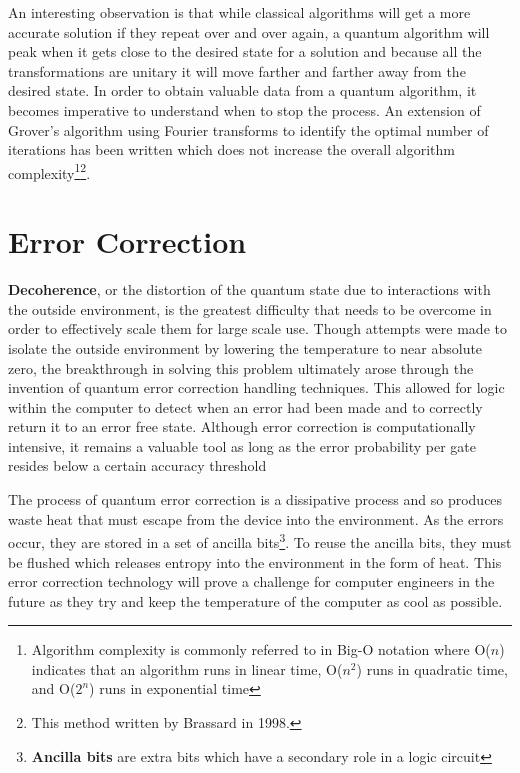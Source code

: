 \documentclass[12pt]{article}
\begin{document}
An interesting observation is that while classical algorithms will get a more accurate solution if they repeat over and over again, a quantum algorithm will peak when it gets close to the desired state for a solution and because all the transformations are unitary it will move farther and farther away from the desired state. In order to obtain valuable data from a quantum algorithm, it becomes imperative to understand when to stop the process. An extension of Grover's algorithm using Fourier transforms to identify the optimal number of iterations has been written which does not increase the overall algorithm complexity\footnote{Algorithm complexity is commonly referred to in Big-O notation where O($n$) indicates that an algorithm runs in linear time, O($n^2$) runs in quadratic time, and O($2^n$) runs in exponential time}\footnote{This method written by Brassard in 1998\cite{non}.}.
\section{Error Correction}
\textbf{Decoherence}, or the distortion of the quantum state due to interactions with the outside environment, is the greatest difficulty that needs to be overcome in order to effectively scale them for large scale use.\cite{non} Though attempts were made to isolate the outside environment by lowering the temperature to near absolute zero, the breakthrough in solving this problem ultimately arose through the invention of quantum error correction handling techniques. This allowed for logic within the computer to detect when an error had been made and to correctly return it to an error free state. Although error correction is computationally intensive, it remains a valuable tool as long as the error probability per gate resides below a certain accuracy threshold
\par
The process of quantum error correction is a dissipative process and so produces waste heat that must escape from the device into the environment. As the errors occur, they are stored in a set of ancilla bits\footnote{\textbf{Ancilla bits} are extra bits which have a secondary role in a logic circuit}. To reuse the ancilla bits, they must be flushed which releases entropy into the environment in the form of heat.\cite{pro} This error correction technology will prove a challenge for computer engineers in the future as they try and keep the temperature of the computer as cool as possible.\par
\end{document}

